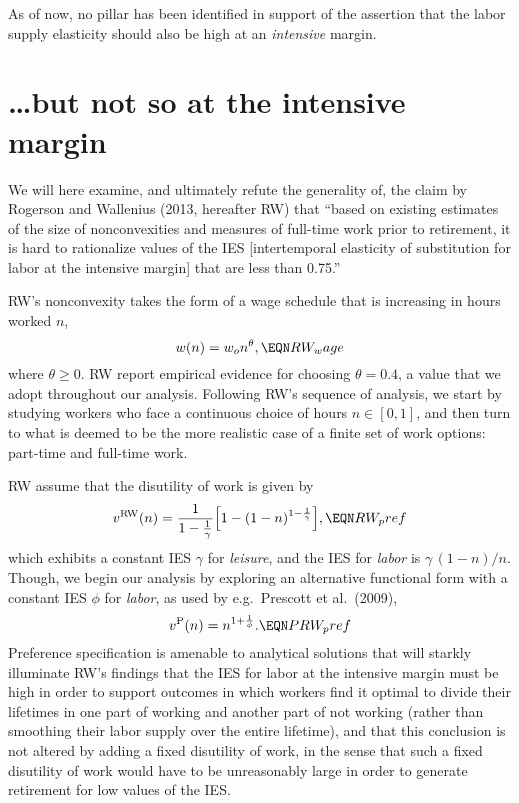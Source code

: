 As of now, no pillar has been identified in support
of the assertion that the labor supply elasticity should also be 
high at an {\it intensive} margin.


\section{\dots but not so at the intensive margin}

We will here examine, and ultimately refute the generality of,
the claim by Rogerson and Wallenius (2013, hereafter RW) 
that ``based on existing estimates of the size of nonconvexities 
and measures of full-time work prior to retirement, it is hard 
to rationalize values of the IES [intertemporal elasticity of
substitution for labor at the intensive margin] that are less 
than 0.75.''

RW's nonconvexity takes the form of a wage schedule that is 
increasing in hours worked $n$,
$$
w(n) = w_o n^\theta,    \EQN RW_wage
$$
where $\theta \geq 0$. RW report empirical evidence for choosing
$\theta=0.4$, a value that we adopt throughout our analysis.
Following RW's sequence of analysis, we start by studying workers 
who face a continuous choice of hours $n\in [0,1]$, and then turn to 
what is deemed to be the more realistic case of a finite set of work
options: part-time and full-time work. 


RW assume that the disutility of work is given by 
$$
v^{\rm RW}(n) = \frac{1}{1-\frac{1}{\gamma}} 
                 \Bigl[1-(1-n)^{1-\frac{1}{\gamma}}\Bigr],  
                                                        \EQN RW_pref
$$
which exhibits a constant IES $\gamma$ for {\it leisure},
and the IES for {\it labor} is $\gamma \,(1-n)/n$.
Though, we begin our analysis by exploring an alternative 
functional form with a constant IES  $\phi$ for {\it labor}, 
as used by e.g.\ Prescott et al.\ (2009),
$$
v^{\rm P}(n) = n^{1+\frac{1}{\phi}}.      \EQN PRW_pref
$$
Preference specification  is amenable to analytical
solutions that will starkly illuminate RW's findings that the IES 
for labor at the intensive margin must be high in order to support 
outcomes in which workers find it optimal to divide their lifetimes
in one part of working and another part of not working (rather than
smoothing their labor supply over the entire lifetime), and that
this conclusion is not altered by adding a fixed disutility of work,
in the sense that such a fixed disutility of work would have to be
unreasonably large in order to generate retirement for low values 
of the IES.
%



